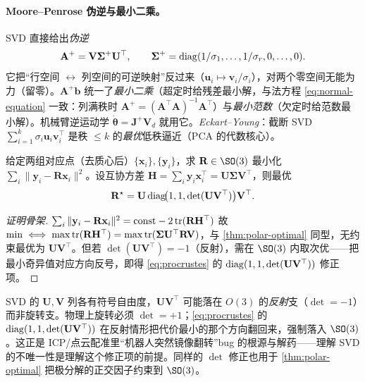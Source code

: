 \paragraph{Moore--Penrose 伪逆与最小二乘。}
SVD 直接给出\emph{伪逆}
\begin{equation}
  \mathbf{A}^+=\mathbf{V}\boldsymbol{\Sigma}^+\mathbf{U}^\top,\qquad\boldsymbol{\Sigma}^+=\operatorname{diag}(1/\sigma_1,\dots,1/\sigma_r,0,\dots,0).
  \label{eq:pinv}
\end{equation}
它把“行空间 $\leftrightarrow$ 列空间的可逆映射”反过来（$\mathbf{u}_i\mapsto\mathbf{v}_i/\sigma_i$），对两个零空间无能为力（留零）。$\mathbf{A}^+\mathbf{b}$ 统一了\emph{最小二乘}（超定时给残差最小解，与法方程 \cref{eq:normal-equation} 一致：列满秩时 $\mathbf{A}^+=(\mathbf{A}^\top\mathbf{A})^{-1}\mathbf{A}^\top$）与\emph{最小范数}（欠定时给范数最小解）。机械臂逆运动学 $\dot{\boldsymbol{\theta}}=\mathbf{J}^+\mathbf{V}_d$ 就用它。\emph{Eckart--Young}：截断 SVD $\sum_{i=1}^k\sigma_i\mathbf{u}_i\mathbf{v}_i^\top$ 是秩 $\le k$ 的\emph{最优}低秩逼近（PCA 的代数核心）。

\begin{theorem}\label{thm:procrustes}
给定两组对应点（去质心后）$\{\mathbf{x}_i\},\{\mathbf{y}_i\}$，求 $\mathbf{R}\in\SO(3)$ 最小化 $\sum_i\|\mathbf{y}_i-\mathbf{R}\mathbf{x}_i\|^2$。设互协方差 $\mathbf{H}=\sum_i\mathbf{y}_i\mathbf{x}_i^\top=\mathbf{U}\boldsymbol{\Sigma}\mathbf{V}^\top$，则最优
\begin{equation}
  \mathbf{R}^\star=\mathbf{U}\operatorname{diag}\!\bigl(1,1,\det(\mathbf{U}\mathbf{V}^\top)\bigr)\mathbf{V}^\top.
  \label{eq:procrustes}
\end{equation}
\end{theorem}
\begin{proof}[证明骨架]
$\sum_i\|\mathbf{y}_i-\mathbf{R}\mathbf{x}_i\|^2=\mathrm{const}-2\operatorname{tr}(\mathbf{R}\mathbf{H}^\top)$ 故 $\min\iff\max\operatorname{tr}(\mathbf{R}\mathbf{H}^\top)=\max\operatorname{tr}(\boldsymbol{\Sigma}\mathbf{U}^\top\mathbf{R}\mathbf{V})$，与 \cref{thm:polar-optimal} 同型，无约束最优为 $\mathbf{U}\mathbf{V}^\top$。但若 $\det(\mathbf{U}\mathbf{V}^\top)=-1$（反射），需在 $\SO(3)$ 内取次优——把最小奇异值对应方向反号，即得 \cref{eq:procrustes} 的 $\operatorname{diag}(1,1,\det(\mathbf{U}\mathbf{V}^\top))$ 修正项。
\end{proof}

\begin{insight}
SVD 的 $\mathbf{U},\mathbf{V}$ 列各有符号自由度，$\mathbf{U}\mathbf{V}^\top$ 可能落在 $O(3)$ 的\emph{反射}支（$\det=-1$）而非旋转支。物理上旋转必须 $\det=+1$；\cref{eq:procrustes} 的 $\operatorname{diag}(1,1,\det(\mathbf{U}\mathbf{V}^\top))$ 在反射情形把代价最小的那个方向翻回来，强制落入 $\SO(3)$。这正是 ICP/点云配准里“机器人突然镜像翻转”bug 的根源与解药——理解 SVD 的不唯一性是理解这个修正项的前提。同样的 $\det$ 修正也用于 \cref{thm:polar-optimal} 把极分解的正交因子约束到 $\SO(3)$。
\end{insight}

